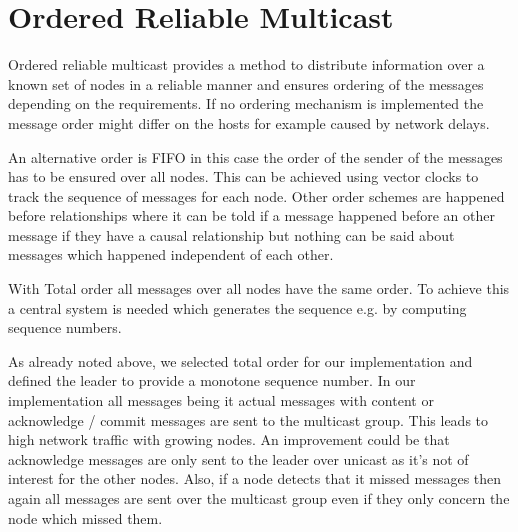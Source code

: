 \section{Ordered Reliable Multicast}\label{sec:OrderedReliableMulticastDetails}
Ordered reliable multicast provides a method to distribute information over a known set of nodes in a reliable manner and ensures ordering of the messages depending on the requirements. 
If no ordering mechanism is implemented the message order might differ on the hosts for example caused by network delays. 

An alternative order is \ac{FIFO} in this case the order of the sender of the messages has to be ensured over all nodes. This can be achieved using vector clocks to track the sequence of messages for each node. Other order schemes are happened before relationships where it can be told if a message happened before an other message if they have a causal relationship but nothing can be said about messages which happened independent of each other. 

With Total order all messages over all nodes have the same order. To achieve this a central system is needed which generates the sequence e.g. by computing sequence numbers.

As already noted above, we selected total order for our implementation and defined the leader to provide a monotone sequence number. In our implementation all messages being it actual messages with content or acknowledge / commit messages are sent to the multicast group. This leads to high network traffic with growing nodes. An improvement could be that acknowledge messages are only sent to the leader over unicast as it's not of interest for the other nodes. 
Also, if a node detects that it missed messages then again all messages are sent over the multicast group even if they only concern the node which missed them.